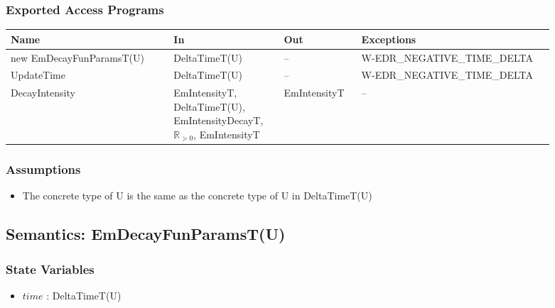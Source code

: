 \subsubsection{Exported Access Programs}
\begin{center}
    \renewcommand{\arraystretch}{1.2}
    \small
    \begin{tabular}{m{0.27\linewidth} m{0.18\linewidth} m{0.12\linewidth}
            m{0.32\linewidth}}
        \toprule
        \textbf{Name} & \textbf{In} & \textbf{Out} & \textbf{Exceptions} \\
        \midrule

        \rowcolor[gray]{0.9}new EmDecayFunParamsT(U) & DeltaTimeT(U) & -- &
        W-EDR\_NEGATIVE\_TIME\_DELTA \\

        UpdateTime & DeltaTimeT(U) & -- & W-EDR\_NEGATIVE\_TIME\_DELTA \\

        \rowcolor[gray]{0.9}DecayIntensity & EmIntensityT, \newline
        DeltaTimeT(U), \newline EmIntensityDecayT, \newline $\mathbb{R}_{>0}$,
        EmIntensityT & EmIntensityT & -- \\

        \bottomrule
    \end{tabular}
\end{center}

\subsubsection{Assumptions}
\begin{itemize}
    \item The concrete type of U is the same as the concrete type of U in
    DeltaTimeT(U)
\end{itemize}

\subsection{Semantics: EmDecayFunParamsT(U)}

\subsubsection{State Variables}
\begin{itemize}

    \item $\mathit{time}$ : DeltaTimeT(U)

\end{itemize}

